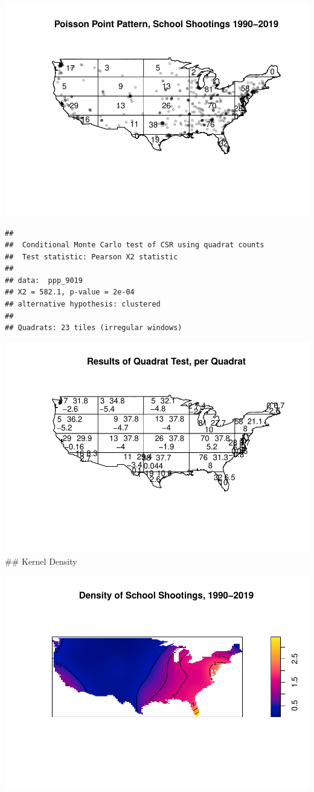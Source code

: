 \documentclass[12pt]{article}
\begin{document}
\includegraphics{JStevenRaquel_STATS295_Final_files/figure-latex/plot-ppp-1990-2019-1.pdf}

\begin{verbatim}
## 
##  Conditional Monte Carlo test of CSR using quadrat counts
##  Test statistic: Pearson X2 statistic
## 
## data:  ppp_9019
## X2 = 582.1, p-value = 2e-04
## alternative hypothesis: clustered
## 
## Quadrats: 23 tiles (irregular windows)
\end{verbatim}

\includegraphics{JStevenRaquel_STATS295_Final_files/figure-latex/quadrat-test-1.pdf}
\#\# Kernel Density

\includegraphics{JStevenRaquel_STATS295_Final_files/figure-latex/density-90-19-1.pdf}
\end{document}
